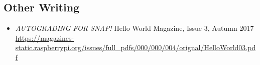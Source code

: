 \vspace{6pt}

\subsection{Other Writing}

\vspace{5pt}

\begin{itemize}

  \setlength\itemsep{1em}

    \item{\textit{AUTOGRADING FOR SNAP!} Hello World Magazine, Issue 3, Autumn 2017}
    \newline
    \small{\href{https://magazines-static.raspberrypi.org/issues/full\_pdfs/000/000/004/orignal/HelloWorld03.pdf}{https://magazines-static.raspberrypi.org/issues/full\_pdfs/000/000/004/orignal/HelloWorld03.pdf}}

\end{itemize}

\vspace{2pt}
